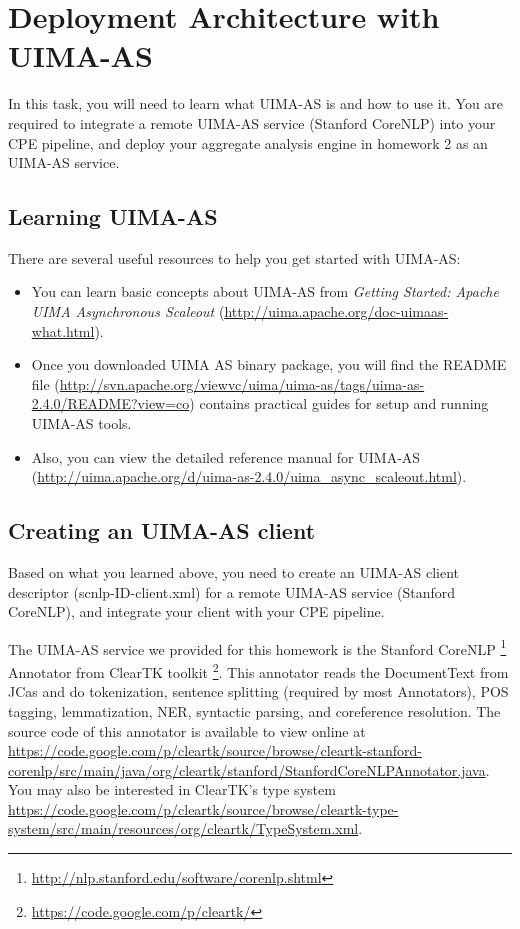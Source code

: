 
\chapter{Deployment Architecture with UIMA-AS}


In this task, you will need to learn what UIMA-AS is and how to use it.
You are required to integrate a remote UIMA-AS service (Stanford CoreNLP) 
into your CPE pipeline, and deploy your aggregate analysis engine in homework 2 
as an UIMA-AS service.  


\section{Learning UIMA-AS}

There are several useful resources to help you get started with UIMA-AS:
\begin{itemize}
  \item You can learn basic concepts about UIMA-AS from 
				\emph{Getting Started: Apache UIMA Asynchronous Scaleout} 
				(\url{http://uima.apache.org/doc-uimaas-what.html}). 
	\item Once you downloaded UIMA AS binary package, you will find the README file 
	   (\url{http://svn.apache.org/viewvc/uima/uima-as/tags/uima-as-2.4.0/README?view=co}) 
	   contains practical guides for setup and running UIMA-AS tools. 
	   \item Also, you can view the detailed reference manual for UIMA-AS 
	   (\url{http://uima.apache.org/d/uima-as-2.4.0/uima_async_scaleout.html}).
\end{itemize}

 

\section{Creating an UIMA-AS client}

Based on what you learned above, you need to create an UIMA-AS client descriptor (scnlp-ID-client.xml) 
for a remote UIMA-AS service (Stanford CoreNLP), and integrate your client with your CPE pipeline.  

The UIMA-AS service we provided for this homework is the 
Stanford CoreNLP \footnote{\url{http://nlp.stanford.edu/software/corenlp.shtml}} Annotator 
from ClearTK toolkit \footnote{\url{https://code.google.com/p/cleartk/}}. 
This annotator reads the DocumentText from JCas and do 
 tokenization, sentence splitting (required by most Annotators), POS tagging, 
 lemmatization, NER, syntactic parsing, and coreference resolution.
 The source code of this annotator is available to view online 
 at \url{https://code.google.com/p/cleartk/source/browse/cleartk-stanford-corenlp/src/main/java/org/cleartk/stanford/StanfordCoreNLPAnnotator.java}.
 You may also be interested in ClearTK's type system 
 \url{https://code.google.com/p/cleartk/source/browse/cleartk-type-system/src/main/resources/org/cleartk/TypeSystem.xml}.

